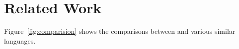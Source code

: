 \section{Related Work}
\label{sec:related}











Figure~\ref{fig:comparision} shows the comparisons between \name and various
similar languages.

